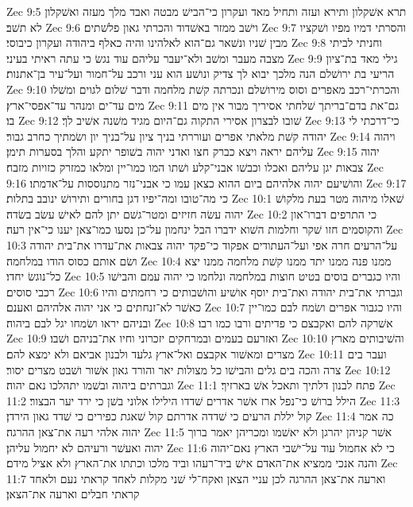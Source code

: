Zec 9:5  תרא אשׁקלון ותירא ועזה ותחיל מאד ועקרון כי־הבישׁ מבטה ואבד מלך מעזה ואשׁקלון לא תשׁב׃
Zec 9:6  וישׁב ממזר באשׁדוד והכרתי גאון פלשׁתים׃
Zec 9:7  והסרתי דמיו מפיו ושׁקציו מבין שׁניו ונשׁאר גם־הוא לאלהינו והיה כאלף ביהודה ועקרון כיבוסי׃
Zec 9:8  וחניתי לביתי מצבה מעבר ומשׁב ולא־יעבר עליהם עוד נגשׂ כי עתה ראיתי בעיני׃
Zec 9:9  גילי מאד בת־ציון הריעי בת ירושׁלם הנה מלכך יבוא לך צדיק ונושׁע הוא עני ורכב על־חמור ועל־עיר בן־אתנות׃
Zec 9:10  והכרתי־רכב מאפרים וסוס מירושׁלם ונכרתה קשׁת מלחמה ודבר שׁלום לגוים ומשׁלו מים עד־ים ומנהר עד־אפסי־ארץ׃
Zec 9:11  גם־את בדם־בריתך שׁלחתי אסיריך מבור אין מים בו׃
Zec 9:12  שׁובו לבצרון אסירי התקוה גם־היום מגיד משׁנה אשׁיב לך׃
Zec 9:13  כי־דרכתי לי יהודה קשׁת מלאתי אפרים ועוררתי בניך ציון על־בניך יון ושׂמתיך כחרב גבור׃
Zec 9:14  ויהוה עליהם יראה ויצא כברק חצו ואדני יהוה בשׁופר יתקע והלך בסערות תימן׃
Zec 9:15  יהוה צבאות יגן עליהם ואכלו וכבשׁו אבני־קלע ושׁתו המו כמו־יין ומלאו כמזרק כזויות מזבח׃
Zec 9:16  והושׁיעם יהוה אלהיהם ביום ההוא כצאן עמו כי אבני־נזר מתנוססות על־אדמתו׃
Zec 9:17  כי מה־טובו ומה־יפיו דגן בחורים ותירושׁ ינובב בתלות׃
Zec 10:1  שׁאלו מיהוה מטר בעת מלקושׁ יהוה עשׂה חזיזים ומטר־גשׁם יתן להם לאישׁ עשׂב בשׂדה׃
Zec 10:2  כי התרפים דברו־און והקוסמים חזו שׁקר וחלמות השׁוא ידברו הבל ינחמון על־כן נסעו כמו־צאן יענו כי־אין רעה׃
Zec 10:3  על־הרעים חרה אפי ועל־העתודים אפקוד כי־פקד יהוה צבאות את־עדרו את־בית יהודה ושׂם אותם כסוס הודו במלחמה׃
Zec 10:4  ממנו פנה ממנו יתד ממנו קשׁת מלחמה ממנו יצא כל־נוגשׂ יחדו׃
Zec 10:5  והיו כגברים בוסים בטיט חוצות במלחמה ונלחמו כי יהוה עמם והבישׁו רכבי סוסים׃
Zec 10:6  וגברתי את־בית יהודה ואת־בית יוסף אושׁיע והושׁבותים כי רחמתים והיו כאשׁר לא־זנחתים כי אני יהוה אלהיהם ואענם׃
Zec 10:7  והיו כגבור אפרים ושׂמח לבם כמו־יין ובניהם יראו ושׂמחו יגל לבם ביהוה׃
Zec 10:8  אשׁרקה להם ואקבצם כי פדיתים ורבו כמו רבו׃
Zec 10:9  ואזרעם בעמים ובמרחקים יזכרוני וחיו את־בניהם ושׁבו׃
Zec 10:10  והשׁיבותים מארץ מצרים ומאשׁור אקבצם ואל־ארץ גלעד ולבנון אביאם ולא ימצא להם׃
Zec 10:11  ועבר בים צרה והכה בים גלים והבישׁו כל מצולות יאר והורד גאון אשׁור ושׁבט מצרים יסור׃
Zec 10:12  וגברתים ביהוה ובשׁמו יתהלכו נאם יהוה׃
Zec 11:1  פתח לבנון דלתיך ותאכל אשׁ בארזיך׃
Zec 11:2  הילל ברושׁ כי־נפל ארז אשׁר אדרים שׁדדו הילילו אלוני בשׁן כי ירד יער הבצור׃
Zec 11:3  קול יללת הרעים כי שׁדדה אדרתם קול שׁאגת כפירים כי שׁדד גאון הירדן׃
Zec 11:4  כה אמר יהוה אלהי רעה את־צאן ההרגה׃
Zec 11:5  אשׁר קניהן יהרגן ולא יאשׁמו ומכריהן יאמר ברוך יהוה ואעשׁר ורעיהם לא יחמול עליהן׃
Zec 11:6  כי לא אחמול עוד על־ישׁבי הארץ נאם־יהוה והנה אנכי ממציא את־האדם אישׁ ביד־רעהו וביד מלכו וכתתו את־הארץ ולא אציל מידם׃
Zec 11:7  וארעה את־צאן ההרגה לכן עניי הצאן ואקח־לי שׁני מקלות לאחד קראתי נעם ולאחד קראתי חבלים וארעה את־הצאן׃
